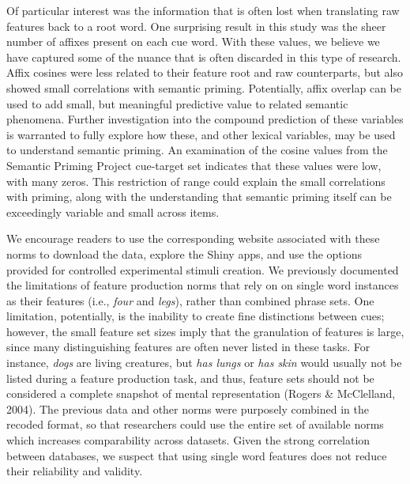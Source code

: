 \documentclass[english,man]{apa6}
\theoremstyle{definition}
\theoremstyle{definition}
\theoremstyle{definition}
\theoremstyle{remark}
\begin{document}
Of particular interest was the information that is often lost when
translating raw features back to a root word. One surprising result in
this study was the sheer number of affixes present on each cue word.
With these values, we believe we have captured some of the nuance that
is often discarded in this type of research. Affix cosines were less
related to their feature root and raw counterparts, but also showed
small correlations with semantic priming. Potentially, affix overlap can
be used to add small, but meaningful predictive value to related
semantic phenomena. Further investigation into the compound prediction
of these variables is warranted to fully explore how these, and other
lexical variables, may be used to understand semantic priming. An
examination of the cosine values from the Semantic Priming Project
cue-target set indicates that these values were low, with many zeros.
This restriction of range could explain the small correlations with
priming, along with the understanding that semantic priming itself can
be exceedingly variable and small across items.

We encourage readers to use the corresponding website associated with
these norms to download the data, explore the Shiny apps, and use the
options provided for controlled experimental stimuli creation. We
previously documented the limitations of feature production norms that
rely on on single word instances as their features (i.e., \emph{four}
and \emph{legs}), rather than combined phrase sets. One limitation,
potentially, is the inability to create fine distinctions between cues;
however, the small feature set sizes imply that the granulation of
features is large, since many distinguishing features are often never
listed in these tasks. For instance, \emph{dogs} are living creatures,
but \emph{has lungs} or \emph{has skin} would usually not be listed
during a feature production task, and thus, feature sets should not be
considered a complete snapshot of mental representation (Rogers \&
McClelland, 2004). The previous data and other norms were purposely
combined in the recoded format, so that researchers could use the entire
set of available norms which increases comparability across datasets.
Given the strong correlation between databases, we suspect that using
single word features does not reduce their reliability and validity.
\end{document}
